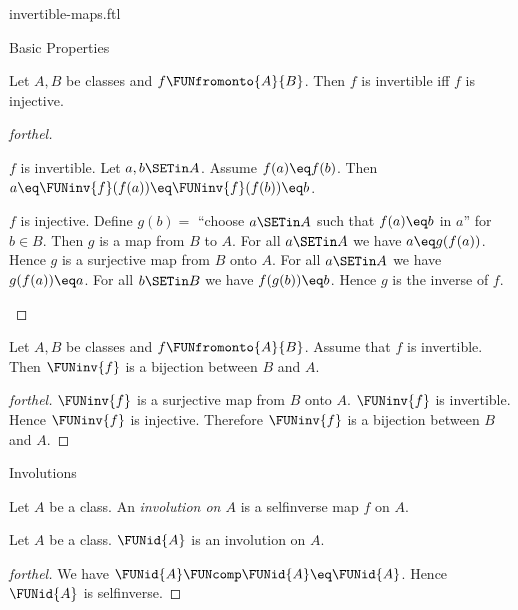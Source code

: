\documentclass{naproche-library}
\begin{document}
\begin{smodule}[title=Invertible Maps]{invertible-maps.ftl}
\begin{sfragment}{Basic Properties}
  \begin{proposition}[forthel,id=FOUNDATIONS_09_6777575974109184]
    Let $A, B$ be classes and $f \FUNfromonto{A}{B}$.
    Then $f$ is invertible iff $f$ is injective.
  \end{proposition}
  \begin{proof}[forthel]
    \begin{case}{$f$ is invertible.}
      Let $a, b \SETin A$.
      Assume $f(a) \eq f(b)$.
      Then $a \eq \FUNinv{f}(f(a)) \eq \FUNinv{f}(f(b)) \eq b$.
    \end{case}

    \begin{case}{$f$ is injective.}
      Define $g(b) =$ ``choose $a \SETin A$ such that $f(a) \eq b$ in $a$'' for
      $b \in B$.
      Then $g$ is a map from $B$ to $A$.
      For all $a \SETin A$ we have $a \eq g(f(a))$.
      Hence $g$ is a surjective map from $B$ onto $A$.
      For all $a \SETin A$ we have $g(f(a)) \eq a$.
      For all $b \SETin B$ we have $f(g(b)) \eq b$.
      Hence $g$ is the inverse of $f$.
    \end{case}
  \end{proof}

  \begin{corollary}[forthel,id=FOUNDATIONS_09_5708971514003456]
    Let $A, B$ be classes and $f \FUNfromonto{A}{B}$.
    Assume that $f$ is invertible.
    Then $\FUNinv{f}$ is a bijection between $B$ and $A$.
  \end{corollary}
  \begin{proof}[forthel]
    $\FUNinv{f}$ is a surjective map from $B$ onto $A$.
    $\FUNinv{f}$ is invertible.
    Hence $\FUNinv{f}$ is injective.
    Therefore $\FUNinv{f}$ is a bijection between $B$ and $A$.
  \end{proof}
\end{sfragment}

\begin{sfragment}{Involutions}
  \begin{definition}[forthel,id=FOUNDATIONS_09_7282039688527872]
    Let $A$ be a class.
    An \emph{involution on $A$} is a selfinverse map $f$ on $A$.
  \end{definition}

  \begin{proposition}[forthel,id=FOUNDATIONS_09_7944474185433088]
    Let $A$ be a class.
    $\FUNid{A}$ is an involution on $A$.
  \end{proposition}
  \begin{proof}[forthel]
    We have $\FUNid{A} \FUNcomp \FUNid{A} \eq \FUNid{A}$.
    Hence $\FUNid{A}$ is selfinverse.
  \end{proof}


\end{sfragment}
\end{smodule}
\end{document}
